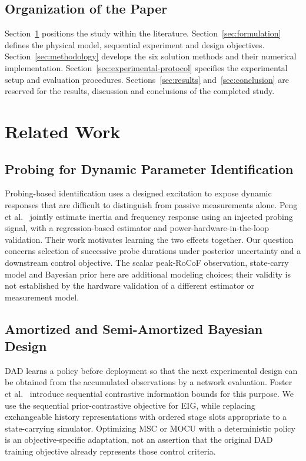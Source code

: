 \documentclass[journal]{IEEEtran}
\begin{document}
\subsection{Organization of the Paper}
Section~\ref{sec:related-work} positions the study within the literature.
Section~\ref{sec:formulation} defines the physical model, sequential experiment
and design objectives. Section~\ref{sec:methodology} develops the six solution
methods and their numerical implementation. Section~\ref{sec:experimental-protocol}
specifies the experimental setup and evaluation procedures.
Sections~\ref{sec:results} and~\ref{sec:conclusion} are reserved for the results,
discussion and conclusions of the completed study.

\section{Related Work}
\label{sec:related-work}
\subsection{Probing for Dynamic Parameter Identification}
Probing-based identification uses a designed excitation to expose dynamic
responses that are difficult to distinguish from passive measurements alone.
Peng et al.~\cite{peng2024probing} jointly estimate inertia and frequency
response using an injected probing signal, with a regression-based estimator
and power-hardware-in-the-loop validation. Their work motivates learning the
two effects together. Our question concerns selection of successive probe
durations under posterior uncertainty and a downstream control objective.
The scalar peak-RoCoF observation, state-carry model and Bayesian prior here
are additional modeling choices; their validity is not established by the
hardware validation of a different estimator or measurement model.

\subsection{Amortized and Semi-Amortized Bayesian Design}
DAD learns a policy before deployment so that the next experimental design can
be obtained from the accumulated observations by a network evaluation.
Foster et al.~\cite{foster2021dad} introduce sequential contrastive information
bounds for this purpose. We use the sequential prior-contrastive objective
for EIG, while replacing exchangeable history representations with ordered
stage slots appropriate to a state-carrying simulator. Optimizing MSC or MOCU
with a deterministic policy is an objective-specific adaptation, not an
assertion that the original DAD training objective already represents those
control criteria.
\end{document}
